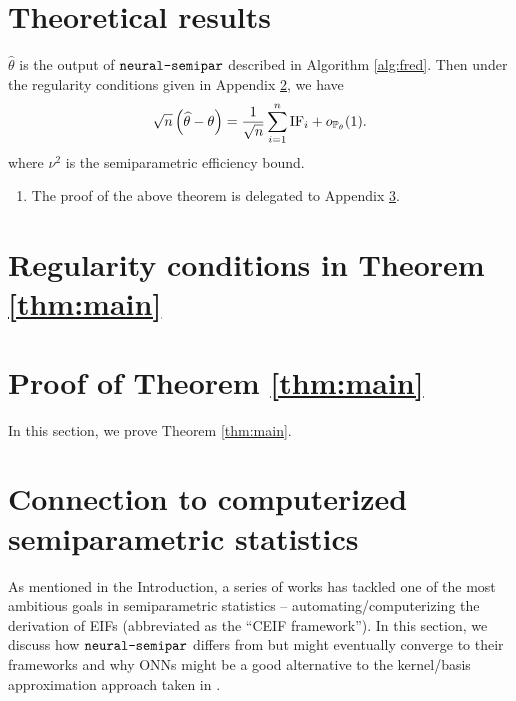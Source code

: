 \documentclass[11pt]{article}
\def\neurosemi{{\normalfont\texttt{neural-semipar}}}
\begin{document}


\appendix
\section{Theoretical results}
\label{app:theory}

\begin{theorem}
\label{thm:main}
$\hat{\theta}$ is the output of $\neurosemi$ described in Algorithm \ref{alg:fred}. Then under the regularity conditions given in Appendix \ref{app:regular}, we have
\begin{equation}
\sqrt{n} \left( \widehat{\theta} - \theta \right) = \frac{1}{\sqrt{n}} \sum_{i = 1}^{n} \mathrm{IF}_{i} + o_{{\mathbb{P}}_{\theta}} (1).
\end{equation}
where $\nu^{2}$ is the semiparametric efficiency bound.
\end{theorem}

\begin{remark}\leavevmode
\begin{enumerate}[label = (\arabic*)]
\item The proof of the above theorem is delegated to Appendix \ref{app:proof}.
\end{enumerate}
\end{remark}

\section{Regularity conditions in Theorem \ref{thm:main}}
\label{app:regular}

\section{Proof of Theorem \ref{thm:main}}
\label{app:proof}

In this section, we prove Theorem \ref{thm:main}.

\section{Connection to computerized semiparametric statistics}
\label{app:vdl}

As mentioned in the Introduction, a series of works \citep{frangakis2015deductive, carone2019toward, williamson2020unified} has tackled one of the most ambitious goals in semiparametric statistics -- automating/computerizing the derivation of EIFs (abbreviated as the ``CEIF framework''). In this section, we discuss how $\neurosemi$ differs from but might eventually converge to their frameworks and why ONNs might be a good alternative to the kernel/basis approximation approach taken in \cite{carone2019toward}.
\end{document}
